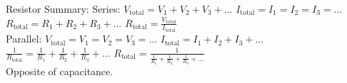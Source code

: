 \documentclass{report}
\begin{document}
Resistor Summary:
Series: $ V_{\text{total}} = V_1 + V_2 + V_3 + \dots $ $ I_{\text{total}} = I_1 = I_2 = I_3 = \dots $ $ R_{\text{total}} = R_1 + R_2 + R_3 + \dots $ $ R_{\text{total}} = \frac{V_{\text{total}}}{I_{\text{total}}} $ \\

Parallel: $ V_{\text{total}} = V_1 = V_2 = V_3 = \dots $ $ I_{\text{total}} = I_1 + I_2 + I_3 + \dots $ $ \frac{1}{R_{\text{total}}} = \frac{1}{R_1} + \frac{1}{R_2} + \frac{1}{R_3} + \dots $ $ R_{\text{total}} = \frac{1}{\frac{1}{R_1} + \frac{1}{R_2} + \frac{1}{R_3} + \dots} $ \\

Opposite of capacitance.
\end{document}

